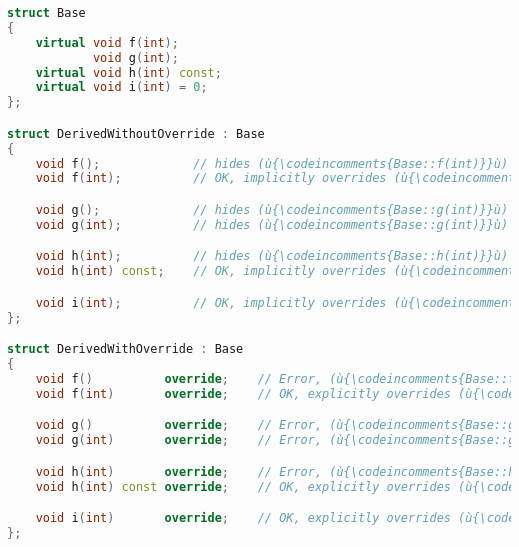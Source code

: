 %
%
%
%
\begin{lstlisting}[language=C++]
struct Base
{
    virtual void f(int);
            void g(int);
    virtual void h(int) const;
    virtual void i(int) = 0;
};

struct DerivedWithoutOverride : Base
{
    void f();             // hides (ù{\codeincomments{Base::f(int)}}ù) (likely mistake)
    void f(int);          // OK, implicitly overrides (ù{\codeincomments{Base::f(int) }}ù)

    void g();             // hides (ù{\codeincomments{Base::g(int)}}ù) (likely mistake)
    void g(int);          // hides (ù{\codeincomments{Base::g(int)}}ù) (likely mistake)

    void h(int);          // hides (ù{\codeincomments{Base::h(int)}}ù) const (likely mistake)
    void h(int) const;    // OK, implicitly overrides (ù{\codeincomments{Base::h(int)}}ù) const

    void i(int);          // OK, implicitly overrides (ù{\codeincomments{Base::i(int)}}ù)
};

struct DerivedWithOverride : Base
{
    void f()          override;    // Error, (ù{\codeincomments{Base::f()}}ù) not found
    void f(int)       override;    // OK, explicitly overrides (ù{\codeincomments{Base::f(int)}}ù)

    void g()          override;    // Error, (ù{\codeincomments{Base::g()}}ù) not found
    void g(int)       override;    // Error, (ù{\codeincomments{Base::g()}}ù) is not virtual.

    void h(int)       override;    // Error, (ù{\codeincomments{Base::h(int)}}ù) not found
    void h(int) const override;    // OK, explicitly overrides (ù{\codeincomments{Base::h(int)}}ù)

    void i(int)       override;    // OK, explicitly overrides (ù{\codeincomments{Base::i(int)}}ù)
};
\end{lstlisting}

